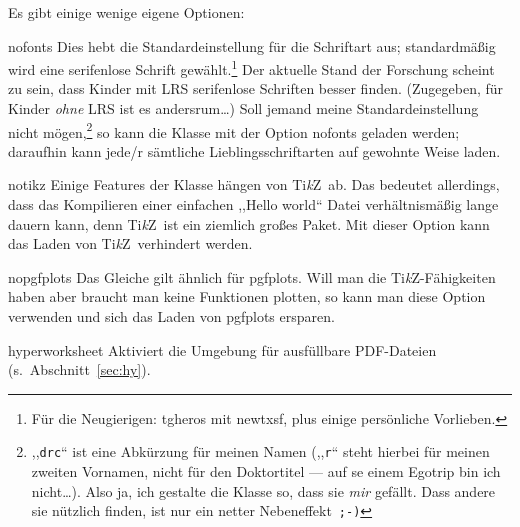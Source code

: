 \documentclass[hyperworksheet]{drcschool}
\newcommand*{\pkg}[1]{\textup{\ttfamily#1}}                                %
\newcommand*{\opt}[1]{\textup{\ttfamily#1}}                                %
\newcommand*{\TikZ}{\textup{Ti\textit{k}Z}}                                %
\begin{document}
Es gibt einige wenige eigene Optionen:
\begin{compactdesc}
\item[\opt{nofonts}] Dies hebt die Standardeinstellung für die
   Schriftart aus; standardmäßig wird eine serifenlose Schrift gewählt.\footnote{%
      Für die Neugierigen: \pkg{tgheros} mit \pkg{newtxsf}, plus einige persönliche Vorlieben.}
   Der aktuelle Stand der Forschung scheint zu sein, dass Kinder mit LRS serifenlose
   Schriften besser finden. (Zugegeben, für Kinder \emph{ohne} LRS ist es andersrum\ldots)
   Soll jemand meine Standardeinstellung nicht mögen,\footnote{%
      ,,\texttt{drc}`` ist eine Abkürzung für meinen Namen (,,\texttt{r}`` steht hierbei
      für meinen zweiten Vornamen, nicht für den Doktortitel --- auf se einem Egotrip bin ich nicht\ldots).
      Also ja, ich gestalte die Klasse so, dass sie \emph{mir} gefällt.
      Dass andere sie nützlich finden, ist nur ein netter Nebeneffekt~\texttt{;-)}}
   so kann die Klasse mit der Option \opt{nofonts} geladen werden; daraufhin kann jede/r
   sämtliche Lieblingsschriftarten auf gewohnte Weise laden.
\item[\opt{notikz}] Einige Features der Klasse hängen von \TikZ\ ab. Das bedeutet allerdings,
   dass das Kompilieren einer einfachen ,,Hello world`` Datei verhältnismäßig lange dauern kann,
   denn \TikZ\ ist ein ziemlich großes Paket. Mit dieser Option kann das Laden von \TikZ\ verhindert werden.
\item[\opt{nopgfplots}] Das Gleiche gilt ähnlich für \pkg{pgfplots}. Will man die \TikZ-Fähigkeiten
   haben aber braucht man keine Funktionen plotten, so kann man diese Option verwenden
   und sich das Laden von \pkg{pgfplots} ersparen.
\item[\opt{hyperworksheet}] Aktiviert die Umgebung für ausfüllbare PDF-Dateien (s.~Abschnitt~\ref{sec:hy}).
\end{compactdesc}
\end{document}
